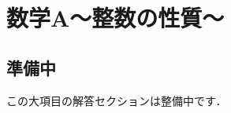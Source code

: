 \documentclass[../../ms_a.tex]{subfiles}
\begin{document}
\section{数学A～整数の性質～}

\subsection*{準備中}
この大項目の解答セクションは整備中です．
\end{document}
